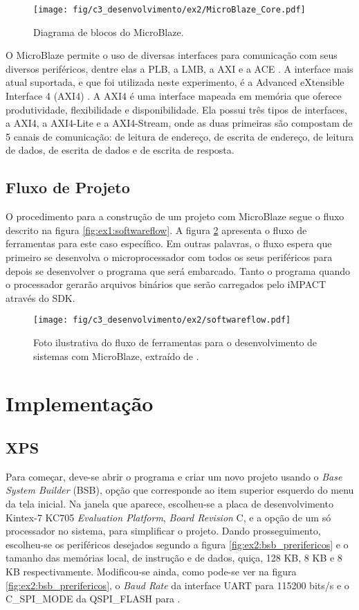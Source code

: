 \documentclass[11pt,a4paper,oneside]{book}
\begin{document}
\begin{figure}[h]
\centering
\texttt{[image: fig/c3\_desenvolvimento/ex2/MicroBlaze\_Core.pdf]}
\caption{Diagrama de blocos do MicroBlaze.}
\label{fig:ex3:microblazecore}
\end{figure}

O MicroBlaze permite o uso de diversas interfaces para comunicação com seus diversos periféricos, dentre elas a PLB, a LMB, a AXI e a ACE \cite{ug081}.
A interface mais atual suportada, e que foi utilizada neste experimento, é a Advanced eXtensible Interface 4 (AXI4) \cite{ug081, ug761}.
A AXI4 é uma interface mapeada em memória que oferece produtividade, flexibilidade e disponibilidade.
Ela possui três tipos de interfaces, a AXI4, a AXI4-Lite e a AXI4-Stream, onde as duas primeiras são compostam de 5 canais de comunicação: de leitura de endereço, de escrita de endereço, de leitura de dados, de escrita de dados e de escrita de resposta.

\subsection{Fluxo de Projeto}
O procedimento para a construção de um projeto com MicroBlaze segue o fluxo descrito na figura \ref{fig:ex1:softwareflow}.
A figura \ref{fig:ex2:softwareflow} apresenta o fluxo de ferramentas para este caso específico.
Em outras palavras, o fluxo espera que primeiro se desenvolva o microprocessador com todos os seus periféricos para depois se desenvolver o programa que será embarcado.
Tanto o programa quando o processador gerarão arquivos binários que serão carregados pelo iMPACT através do SDK.

\begin{figure}[htp]
\centering
\texttt{[image: fig/c3\_desenvolvimento/ex2/softwareflow.pdf]}
\caption{Foto ilustrativa do fluxo de ferramentas para o desenvolvimento de sistemas com MicroBlaze, extraído de \cite{ug081}.}
\label{fig:ex2:softwareflow}
\end{figure}

\section{Implementação}
\subsection{XPS}
Para começar, deve-se abrir o programa e criar um novo projeto usando o \textit{Base System Builder} (BSB), opção que corresponde ao item superior esquerdo do menu da tela inicial.
Na janela que aparece, escolheu-se a placa de desenvolvimento Kintex-7 KC705 \textit{Evaluation Platform}, \textit{Board Revision} C, e a opção de um só processador no sistema, para simplificar o projeto.
Dando prosseguimento, escolheu-se os periféricos desejados segundo a figura \ref{fig:ex2:bsb_prerifericos} e o tamanho das memórias local, de instrução e de dados, quiça, 128 KB, 8 KB e 8 KB respectivamente.
Modificou-se ainda, como pode-se ver na figura \ref{fig:ex2:bsb_prerifericos}, o \textit{Baud Rate} da interface UART para 115200 bits/s e o C\_SPI\_MODE da QSPI\_FLASH para .
\end{document}
